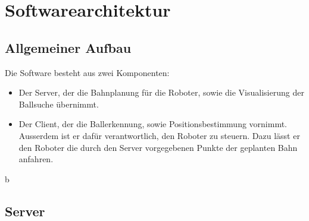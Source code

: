 
\chapter{Softwarearchitektur}
\label{cha:softwarearchitektur}

\section{Allgemeiner Aufbau}
\label{sec:allgemeiner-aufbau}

Die Software besteht aus zwei Komponenten:
\begin{itemize}
\item Der Server, der die Bahnplanung für die Roboter, sowie die
  Visualisierung der Ballsuche übernimmt.
\item Der Client, der die Ballerkennung, sowie Positionsbestimmung
  vornimmt. Ausserdem ist er dafür verantwortlich, den Roboter zu
  steuern. Dazu lässt er den Roboter die durch den Server vorgegebenen
  Punkte der geplanten Bahn anfahren. 
\end{itemize}
b
\section{Server}
\label{sec:server}


